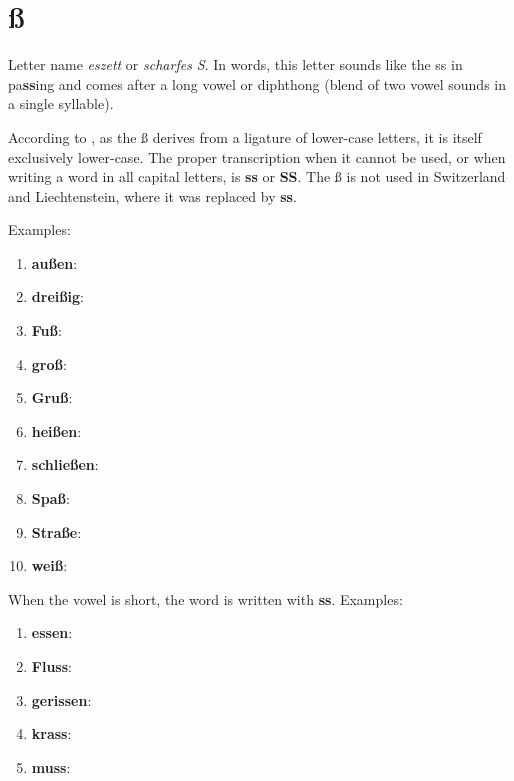 \section*{ß}

Letter name \textit{eszett} or \textit{scharfes S}. In words, this letter sounds like the ss in pa\textbf{ss}ing and comes after a long vowel or diphthong (blend of two vowel sounds in a single syllable).

According to \cite{wiki_germanalpha}, as the ß derives from a ligature of lower-case letters, it is itself exclusively lower-case. The proper transcription when it cannot be used, or when writing a word in all capital letters, is \textbf{ss} or \textbf{SS}. The ß is not used in Switzerland and Liechtenstein, where it was replaced by \textbf{ss}.

Examples:
\begin{enumerate}
    \item \textbf{außen}: \textipa{["aUs@n]}
    \item \textbf{dreißig}: \textipa{["draIsI\c{c}]}
    \item \textbf{Fuß}: \textipa{[fu:s]}
    \item \textbf{groß}: \textipa{[gro:s]}
    \item \textbf{Gruß}: \textipa{[gru:s]}
    \item \textbf{heißen}: \textipa{["haIs@n]}
    \item \textbf{schließen}: \textipa{["Sli:s@n]}
    \item \textbf{Spaß}: \textipa{[Spa:s]}
    \item \textbf{Straße}: \textipa{["Stra:s@]}
    \item \textbf{weiß}: \textipa{[vaIs]}
\end{enumerate}

When the vowel is short, the word is written with \textbf{ss}. Examples:

\begin{enumerate}
    \item \textbf{essen}: \textipa{["Es@n]}
    \item \textbf{Fluss}: \textipa{[flUs]}
    \item \textbf{gerissen}: \textipa{[g@"rIs@n]}
    \item \textbf{krass}: \textipa{[kras]}
    \item \textbf{muss}: \textipa{[mUs]}
\end{enumerate}
